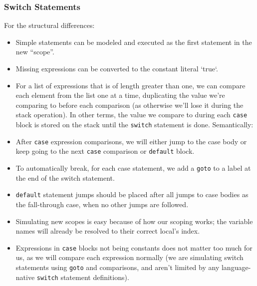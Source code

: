 \documentclass[11pt]{article}
\begin{document}
\subsubsection{Switch Statements}
For the structural differences:
\begin{itemize}[noitemsep]
	\item Simple statements can be modeled and executed as the first statement in
	      the new ``scope''.
	\item Missing expressions can be converted to the constant literal `true`.
	\item For a list of expressions that is of length greater than one, we
	      can compare each element from the list one at a time,
	      duplicating the value we're comparing to before each comparison
	      (as otherwise we'll lose it during the stack operation). In
	      other terms, the value we compare to during each \texttt{case} block is
	      stored on the stack until the \texttt{switch} statement is done.
	      Semantically:
\end{itemize}
\begin{itemize}[noitemsep]
	\item After \texttt{case} expression comparisons, we will either jump to the case body
	      or keep going to the next \texttt{case} comparison or \texttt{default} block.
	\item To automatically break, for each case statement, we add a \texttt{goto}
	      to a label at the end of the switch statement.
	\item \texttt{default} statement jumps should be placed after all jumps to case bodies
	      as the fall-through case, when no other jumps are followed.
	\item Simulating new scopes is easy because of how our scoping works;
	      the variable names will already be resolved to their correct
	      local's index.
	\item Expressions in \texttt{case} blocks not being constants does not matter too much
	      for us, as we will compare each expression normally (we are
	      simulating switch statements using \texttt{goto} and comparisons, and
	      aren't limited by any language-native \texttt{switch} statement
	      definitions).
\end{itemize}
\end{document}
